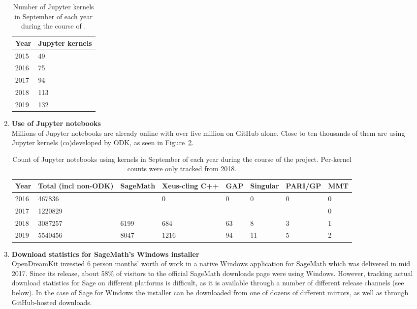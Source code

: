 \begin{enumerate}
  \begin{table}
  \begin{tabular}{|l|l|}\hline
    Year & Jupyter kernels \\
    \hline
    2015 & 49 \\
    2016 & 75 \\
    2017 & 94 \\
    2018 & 113 \\
    2019 & 132 \\
    \hline
  \end{tabular}
  \caption{Number of Jupyter kernels in September of each year
  during the course of \ODK.}
  \label{fig:count-kernels}
  \end{table}

\item \textbf{Use of Jupyter notebooks}\\
  Millions of Jupyter notebooks are already online with over five million
  on GitHub alone. Close to ten thousands of them are using Jupyter kernels (co)developed by ODK, as seen in Figure~\ref{fig:count-notebooks}.

  \begin{table}
  \begin{tabular}{|l|l|l|l|l|l|l|l|}\hline
    Year & Total (incl non-ODK) & SageMath & Xeus-cling C++ & GAP & Singular & PARI/GP & MMT \\
    \hline
    2016 & 467836 & & 0 & 0 & 0 & 0 & 0 \\
    2017 & 1220829 & & & & & & 0 \\
    2018 & 3087257 & 6199 & 684 & 63 & 8 & 3 & 1 \\
    2019 & 5540456 & 8047 & 1216 & 94 & 11 & 5 & 2\\
    \hline
  \end{tabular}
  \caption{Count of Jupyter notebooks using \ODK kernels in September of each year
  during the course of the project.
  Per-kernel counts were only tracked from 2018.}
  \label{fig:count-notebooks}
  \end{table}

\item \textbf{Download statistics for SageMath's Windows installer}\\
  OpenDreamKit invested 6 person months' worth of work in a native Windows
  application for SageMath which was delivered in mid 2017. Since its release,
  about 58\% of visitors to the official SageMath downloads page were using
  Windows.  However, tracking actual download statistics for Sage on different
  platforms is difficult, as it is available through a number of different
  release channels (see below).  In the case of Sage for Windows the installer
  can be downloaded from one of dozens of different mirrors, as well as
  through GitHub-hosted downloads.


\end{enumerate}
